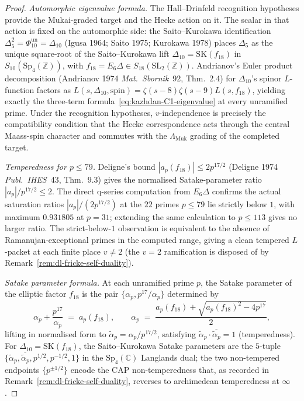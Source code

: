 \begin{proof}
\emph{Automorphic eigenvalue formula.} The Hall--Drinfeld
recognition hypotheses provide the Mukai-graded target and the Hecke
action on it. The scalar in that action is fixed on the automorphic
side: the Saito--Kurokawa identification
$\Delta_5^2=\Phi_{10}^{\mathrm{un}}=\Delta_{10}$
(Igusa 1964; Saito 1975;
Kurokawa 1978) places $\Delta_5$ as the unique square-root of the
Saito--Kurokawa lift $\Delta_{10}=\mathrm{SK}(f_{18})$ in $S_{10}(
\mathrm{Sp}_4(\mathbb{Z}))$, with
$f_{18}=E_6\Delta\in S_{18}(\mathrm{SL}_2(\mathbb Z))$.
Andrianov's Euler product decomposition
(Andrianov 1974 \emph{Mat.~Sbornik}~92, Thm.~2.4) for $\Delta_{10}$'s
spinor $L$-function factors as
$L(s, \Delta_{10}, \mathrm{spin}) = \zeta(s - 8)\zeta(s - 9)
L(s, f_{18})$, yielding exactly the three-term
formula~\eqref{eq:kazhdan-C1-eigenvalue} at every unramified
prime. Under the recognition hypotheses, $v$-independence is precisely
the compatibility condition that the Hecke correspondence acts through
the central Maass-spin character and commutes with the
$\Lambda_{\mathrm{Muk}}$ grading of the completed target.

\emph{Temperedness for $p \le 79$.} Deligne's bound
$|a_p(f_{18})| \le 2 p^{17/2}$ (Deligne 1974 \emph{Publ.~IHES}~43,
Thm.~9.3) gives the normalised Satake-parameter ratio
$|a_p| / p^{17/2} \le 2$. The direct q-series computation from
$E_6\Delta$ confirms the actual saturation ratios
$|a_p|/(2 p^{17/2})$ at the $22$ primes $p \le 79$ lie strictly below
$1$, with maximum $0.931805$ at $p = 31$; extending the same
calculation to $p\le 113$ gives no larger ratio. The strict-below-$1$
observation is equivalent to the absence of Ramanujan-exceptional
primes in the computed range, giving a clean tempered $L$-packet at
each finite place $v \ne 2$ (the $v = 2$ ramification is disposed
of by Remark~\ref{rem:dl-fricke-self-duality}).

\emph{Satake parameter formula.} At each unramified prime $p$, the
Satake parameter of the elliptic factor $f_{18}$ is the pair
$\{\alpha_p, p^{17}/\alpha_p\}$ determined by
\begin{equation}
\label{eq:kazhdan-C3-satake}
 \alpha_p + \frac{p^{17}}{\alpha_p} \;=\; a_p(f_{18}),
 \qquad
 \alpha_p \;=\;
 \frac{a_p(f_{18}) +
 \sqrt{a_p(f_{18})^2 - 4 p^{17}}}{2},
\end{equation}
lifting in normalised form to
$\tilde\alpha_p = \alpha_p / p^{17/2}$, satisfying
$\tilde\alpha_p \cdot \overline{\tilde\alpha_p} = 1$ (temperedness). For
$\Delta_{10} = \mathrm{SK}(f_{18})$, the Saito--Kurokawa Satake
parameters are the $5$-tuple $\{\tilde\alpha_p, \overline{\tilde\alpha_p},
p^{1/2}, p^{-1/2}, 1\}$ in the $\mathrm{Sp}_4(\mathbb{C})$
Langlands dual; the two non-tempered endpoints $\{p^{\pm 1/2}\}$
encode the CAP non-temperedness that, as recorded in
Remark~\ref{rem:dl-fricke-self-duality}, reverses to
archimedean temperedness at $\infty$.


\end{proof}
